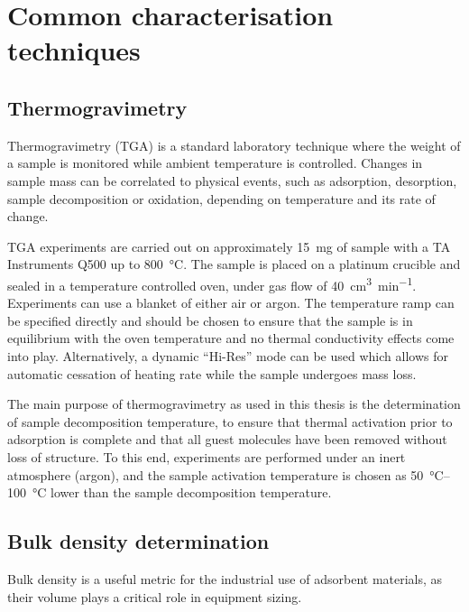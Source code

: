 
\graphicspath{ {\thisappx/figures/} }

\chapter{Common characterisation techniques}

\section{Thermogravimetry}\label{appx:char:TGA}

Thermogravimetry (TGA) is a standard laboratory technique where the
weight of a sample is monitored while ambient temperature is controlled.
Changes in sample mass can be correlated to physical events, such
as adsorption, desorption, sample decomposition or oxidation, depending
on temperature and its rate of change.

TGA experiments are carried out on approximately \SI{15}{\milli\gram} of 
sample with a TA Instruments Q500 up to \SI{800}{\degreeCelsius}.
The sample is placed on a platinum crucible and sealed in a temperature
controlled oven, under gas flow of \SI{40}{\cm\cubed\per\minute}.
Experiments can use a blanket of either air or argon. The temperature
ramp can be specified directly and should be chosen to ensure 
that the sample is in equilibrium with the oven temperature and no
thermal conductivity effects come into play. Alternatively,
a dynamic “Hi-Res” mode can be used which allows for automatic
cessation of heating rate while the sample undergoes mass loss.

The main purpose of thermogravimetry as used in this thesis is the
determination of sample decomposition temperature, to ensure
that thermal activation prior to adsorption is complete and 
that all guest molecules have been removed without loss of
structure. To this end, experiments are performed under an inert
atmosphere (argon), and the sample activation temperature is chosen
as \SIrange{50}{100}{\degreeCelsius} lower than the sample 
decomposition temperature.

\section{Bulk density determination}\label{appx:char:bulkdensity}

Bulk density is a useful metric for the industrial use of adsorbent
materials, as their volume plays a critical role in equipment sizing.

